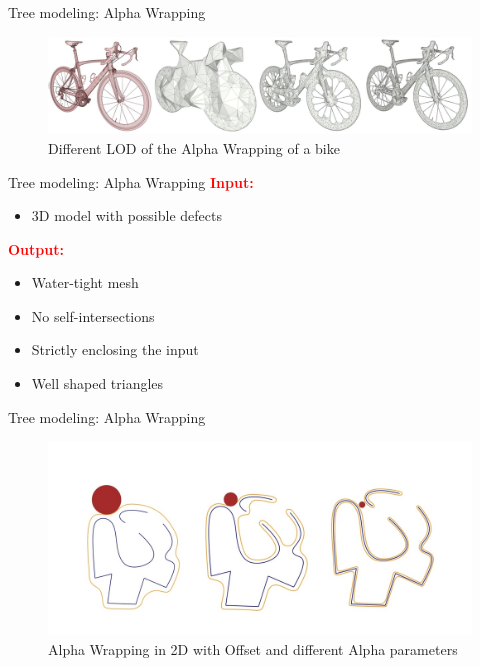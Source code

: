 \documentclass[10pt]{beamer}
\begin{document}
  \begin{frame}{Tree modeling: Alpha Wrapping}
	\begin{figure}[H]
	  \centering
		  \centering
		  \includegraphics[width=\textwidth]{images/alpha-wrapping-bike.jpg}
		  \caption{Different LOD of the Alpha Wrapping of a bike\cite{cgal_alpha_wrapper}}
  \end{figure}
  \end{frame}


  \begin{frame}{Tree modeling: Alpha Wrapping}
	\Large
	\textcolor{red}{\textbf{Input:}}
	  \begin{itemize}
	  \item  3D model with possible defects
	  \end{itemize}
	  \textcolor{red}{\textbf{Output:} }
	  \begin{itemize}
		\item Water-tight mesh
		\item No self-intersections
		\item Strictly enclosing the input
		\item Well shaped triangles
	  \end{itemize}
  \end{frame}


  \begin{frame}{Tree modeling: Alpha Wrapping}
	\Large
	\begin{figure}[H]
	  \centering
	  \includegraphics[width=\textwidth]{images/alpha-wrapping-ball.jpg}
	  \caption{Alpha Wrapping in 2D with Offset and different Alpha parameters}
  \end{figure}
  \end{frame}
\end{document}

